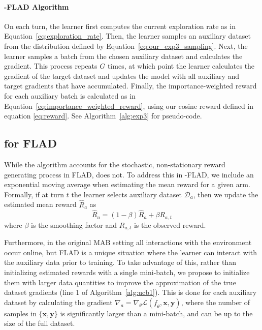 \paragraph{\ex{}-FLAD Algorithm}
On each turn, the learner first computes the current exploration rate as in Equation~\ref{eq:exploration_rate}. Then, the learner samples an auxiliary dataset from the distribution defined by Equation~\ref{eq:our_exp3_sampling}. Next, the learner samples a batch from the chosen auxiliary dataset and calculates the gradient. This process repeats $G$ times, at which point the learner calculates the gradient of the target dataset and updates the model with all auxiliary and target gradients that have accumulated. Finally, the importance-weighted reward for each auxiliary batch is calculated as in Equation~\ref{eq:importance_weighted_reward}, using our cosine reward defined in equation \ref{eq:reward}. See Algorithm~\ref{alg:exp3} for pseudo-code.

\subsection{\ucb{} for FLAD}
While the \ex{} algorithm accounts for the stochastic, non-stationary reward generating process in FLAD, \ucb{} does not. To address this in \ucb{}-FLAD, we include an exponential moving average when estimating the mean reward for a given arm.
Formally, if at turn $t$ the learner selects auxiliary dataset $\mathcal{D}_a$, then we update the estimated mean reward $\hat{R}_{a}$ as 
\begin{equation}
\label{eq:ema_smoothing}
    \hat{R}_{a} = (1-\beta)\hat{R}_{a} + \beta R_{a,t}
\end{equation}
where $\beta$ is the smoothing factor and $R_{a,t}$ is the observed reward.

Furthermore, in the original MAB setting all interactions with the environment occur online, but FLAD is a unique situation where the learner can interact with the auxiliary data prior to training.
To take advantage of this, rather than initializing estimated rewards with a single mini-batch, we propose to initialize them with larger data quantities to improve the approximation of the true dataset gradients (line 1 of Algorithm~\ref{alg:ucb1}).
This is done for each auxiliary dataset by calculating the gradient $\nabla_{a}=\nabla_{\theta}\mathcal{L}(\mathit{f}_{\theta},\mathbf{x},\mathbf{y})$, where the number of samples in $\{\mathbf{x},\mathbf{y}\}$ is significantly larger than a mini-batch, and can be up to the size of the full dataset.

